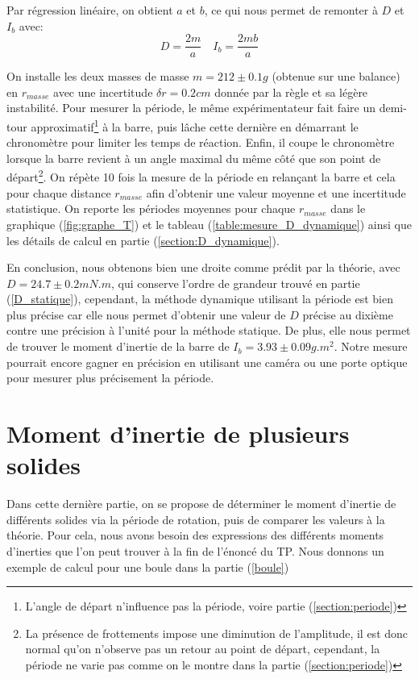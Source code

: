 \documentclass[12pt]{article}
\begin{document}
Par régression linéaire, on obtient $a$ et $b$, ce qui nous permet de remonter à $D$ et $I_b$ avec:
\begin{equation}
    D = \frac{2m}{a} \quad I_b = \frac{2mb}{a}
\end{equation}

On installe les deux masses de masse $m = 212 \pm 0.1g$ (obtenue sur une balance) en $r_{masse}$ avec une incertitude $\delta r = 0.2cm$ donnée par la règle et sa légère instabilité.
Pour mesurer la période, le même expérimentateur fait faire un demi-tour approximatif\footnote{L'angle de départ n'influence pas la période, voire partie (\ref{section:periode})} à la barre,
puis lâche cette dernière en démarrant le chronomètre pour limiter les temps de réaction. Enfin, il coupe le chronomètre lorsque la barre revient à un angle maximal du même côté que son point de
départ\footnote{La présence de frottements impose une diminution de l'amplitude, il est donc normal qu'on n'observe pas un retour au point de départ, cependant, 
la période ne varie pas comme on le montre dans la partie (\ref{section:periode})}. 
On répète 10 fois la mesure de la période en relançant la barre et cela pour chaque distance $r_{masse}$ 
afin d'obtenir une valeur moyenne et une incertitude statistique. On reporte les périodes moyennes pour 
chaque $r_{masse}$ dans le graphique (\ref{fig:graphe_T}) et le tableau (\ref{table:mesure_D_dynamique}) ainsi que les détails de calcul en 
partie (\ref{section:D_dynamique}).

En conclusion, nous obtenons bien une droite comme prédit par la théorie, avec $D = 24.7 \pm 0.2 mN.m$, qui conserve l'ordre de grandeur trouvé en partie (\ref{D_statique}), cependant, la méthode
dynamique utilisant la période est bien plus précise car elle nous permet d'obtenir une valeur de $D$ précise au dixième contre une précision
à l'unité pour la méthode statique. De plus, elle nous permet de trouver le moment d'inertie de la barre de $I_b = 3.93 \pm 0.09g.m^2$. Notre mesure pourrait
encore gagner en précision en utilisant une caméra ou une porte optique pour mesurer plus précisement la période.

\break



\section{Moment d'inertie de plusieurs solides}
Dans cette dernière partie, on se propose de déterminer le moment d'inertie de différents solides via la période
de rotation, puis de comparer les valeurs à la théorie. Pour cela, nous avons besoin des expressions des différents moments d'inerties que l'on peut trouver à la fin de l'énoncé
du TP. Nous donnons un exemple de calcul pour une boule dans la partie (\ref{boule})
\end{document}
